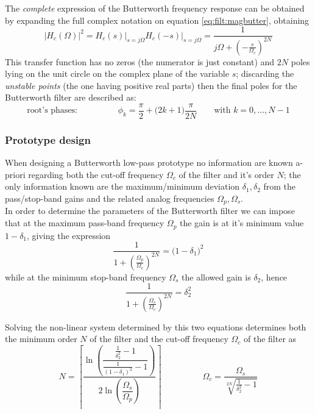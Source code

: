 		The \textit{complete} expression of the Butterworth frequency response can be obtained by expanding the full complex notation on equation \ref{eq:filt:magbutter}, obtaining
		\begin{equation}
			|H_c(\Omega)|^2 = H_c(s)\Big|_{s=j\Omega} H_c(-s)\Big|_{s=j\Omega} = \frac{1}{j\Omega + \left( -\frac{s}{\Omega_c} \right)^{2N}}
		\end{equation}
		This transfer function has no zeros (the numerator is just constant) and $2N$ poles lying on the unit circle on the complex plane of the variable $s$; discarding the \textit{unstable points} (the one having positive real parts) then the final poles for the Butterworth filter are described as:
		\begin{equation} \label{eq:filt:buttphase}
			\text{root's phases:} \hspace{2cm} \phi_k = \frac \pi 2 + \big(2k+1\big) \frac{\pi}{2N} \qquad \textrm{with } k=0,\dots, N-1
		\end{equation} 
	
		\subsubsection{Prototype design}
		When designing a Butterworth low-pass prototype no information are known a-priori regarding both the cut-off frequency $\Omega_c$ of the filter and it's order $N$; the only information known are the maximum/minimum deviation $\delta_1,\delta_2$  from the pass/stop-band gains and the related analog  frequencies $\Omega_p,\Omega_s$.\\
		In order to determine the parameters of the Butterworth filter we can impose that at the maximum pass-band frequency $\Omega_p$ the gain is at it's minimum value $1-\delta_1$, giving the expression
		\[ \frac 1 {1 + \left( \frac{\Omega_p}{\Omega_c} \right)^{2N}} = \big(1-\delta_1\big)^2 \]
		while at the minimum stop-band frequency $\Omega_s$ the allowed gain is $\delta_2$, hence
		\[ \frac 1 {1 + \left( \frac{\Omega_s}{\Omega_c} \right)^{2N}} = \delta_2^2 \]
	
		Solving the non-linear system determined by this two equations determines both the minimum order $N$ of the filter and the cut-off frequency $\Omega_c$ of the filter as
		\begin{equation} \label{eq:filt:butter}
			N = \left\lceil \frac{\ln \left( \dfrac{ \frac 1 {\delta_2^2} -1 }{\frac{1}{(1-\delta_1)^2}-1} \right)}{2 \ln \left(\dfrac{\Omega_s}{\Omega_p}\right)} \right\rceil \hspace{2cm} \Omega_c = \frac{\Omega_s}{\sqrt[2N]{\frac{1}{\delta_2^2}-1}}
		\end{equation}
		
